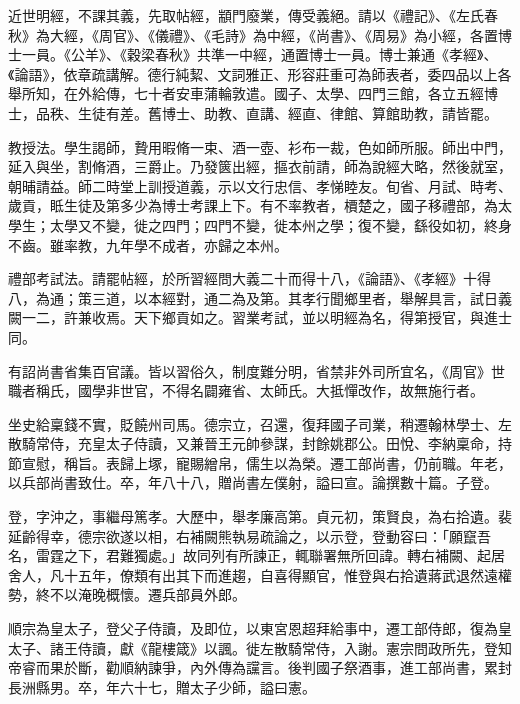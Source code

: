 \begin{pinyinscope}
 近世明經，不課其義，先取帖經，顓門廢業，傳受義絕。請以《禮記》、《左氏春秋》為大經，《周官》、《儀禮》、《毛詩》為中經，《尚書》、《周易》為小經，各置博士一員。《公羊》、《穀梁春秋》共準一中經，通置博士一員。博士兼通《孝經》、《論語》，依章疏講解。德行純絜、文詞雅正、形容莊重可為師表者，委四品以上各舉所知，在外給傳，七十者安車蒲輪敦遣。國子、太學、四門三館，各立五經博士，品秩、生徒有差。舊博士、助教、直講、經直、律館、算館助教，請皆罷。



 教授法。學生謁師，贄用暇脩一束、酒一壺、衫布一裁，色如師所服。師出中門，延入與坐，割脩酒，三爵止。乃發篋出經，摳衣前請，師為說經大略，然後就室，朝晡請益。師二時堂上訓授道義，示以文行忠信、孝悌睦友。旬省、月試、時考、歲貢，眡生徒及第多少為博士考課上下。有不率教者，檟楚之，國子移禮部，為太學生；太學又不變，徙之四門；四門不變，徙本州之學；復不變，繇役如初，終身不齒。雖率教，九年學不成者，亦歸之本州。



 禮部考試法。請罷帖經，於所習經問大義二十而得十八，《論語》、《孝經》十得八，為通；策三道，以本經對，通二為及第。其孝行聞鄉里者，舉解具言，試日義闕一二，許兼收焉。天下鄉貢如之。習業考試，並以明經為名，得第授官，與進士同。



 有詔尚書省集百官議。皆以習俗久，制度難分明，省禁非外司所宜名，《周官》世職者稱氏，國學非世官，不得名闢雍省、太師氏。大抵憚改作，故無施行者。



 坐史給稟錢不實，貶饒州司馬。德宗立，召還，復拜國子司業，稍遷翰林學士、左散騎常侍，充皇太子侍讀，又兼晉王元帥參謀，封餘姚郡公。田悅、李納稟命，持節宣慰，稱旨。表歸上塚，寵賜繒帛，儒生以為榮。遷工部尚書，仍前職。年老，以兵部尚書致仕。卒，年八十八，贈尚書左僕射，謚曰宣。論撰數十篇。子登。



 登，字沖之，事繼母篤孝。大歷中，舉孝廉高第。貞元初，策賢良，為右拾遺。裴延齡得幸，德宗欲遂以相，右補闕熊執易疏論之，以示登，登動容曰：「願竄吾名，雷霆之下，君難獨處。」故同列有所諫正，輒聯署無所回諱。轉右補闕、起居舍人，凡十五年，僚類有出其下而進趨，自喜得顯官，惟登與右拾遺蔣武退然遠權勢，終不以淹晚概懷。遷兵部員外郎。



 順宗為皇太子，登父子侍讀，及即位，以東宮恩超拜給事中，遷工部侍郎，復為皇太子、諸王侍讀，獻《龍樓箴》以諷。徙左散騎常侍，入謝。憲宗問政所先，登知帝睿而果於斷，勸順納諫爭，內外傳為讜言。後判國子祭酒事，進工部尚書，累封長洲縣男。卒，年六十七，贈太子少師，謚曰憲。




\end{pinyinscope}

